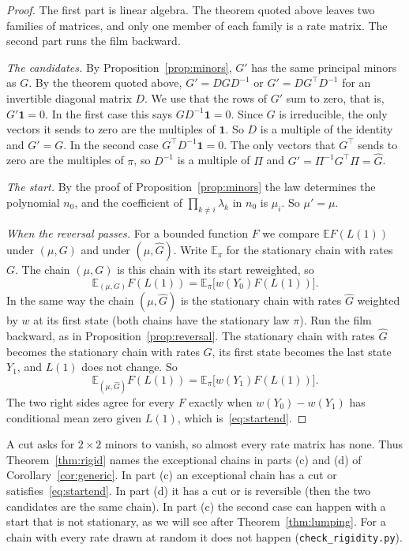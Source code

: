 \documentclass[11pt]{article}
\theoremstyle{definition}
\theoremstyle{remark}
\newcommand{\E}{\mathbb E}
\newcommand{\one}{\mathbf 1}
\begin{document}
\begin{proof}
The first part is linear algebra. The theorem quoted above leaves two
families of matrices, and only one member of each family is a rate matrix. The
second part runs the film backward.

\emph{The candidates.} By Proposition~\ref{prop:minors}, $G'$ has the same
principal minors as $G$. By the theorem quoted above, $G'=DGD^{-1}$ or
$G'=DG^{\top}D^{-1}$ for an invertible diagonal matrix $D$. We use that the rows
of $G'$ sum to zero, that is, $G'\one=0$. In the first case this says
$GD^{-1}\one=0$. Since $G$ is irreducible, the only vectors it sends to zero are
the multiples of $\one$. So $D$ is a multiple of the identity and $G'=G$. In
the second case $G^{\top}D^{-1}\one=0$. The only vectors that $G^{\top}$ sends
to zero are the multiples of $\pi$, so $D^{-1}$ is a multiple of $\Pi$ and
$G'=\Pi^{-1}G^{\top}\Pi=\hat G$.

\emph{The start.} By the proof of Proposition~\ref{prop:minors} the law
determines the polynomial $n_0$, and the coefficient of
$\prod_{k\ne i}\lambda_k$ in $n_0$ is $\mu_i$. So $\mu'=\mu$.

\emph{When the reversal passes.} For a bounded function $F$ we compare
$\E F(L(1))$ under $(\mu,G)$ and under $(\mu,\hat G)$. Write $\E_\pi$ for the
stationary chain with rates $G$. The chain $(\mu,G)$ is this chain with its
start reweighted, so
\[
\E_{(\mu,G)}F(L(1))=\E_\pi\bigl[w(Y_0)F(L(1))\bigr].
\]
In the same way the chain $(\mu,\hat G)$ is the stationary chain with rates
$\hat G$ weighted by $w$ at its first state (both chains have the stationary
law $\pi$). Run the film backward, as in Proposition~\ref{prop:reversal}. The
stationary chain with rates $\hat G$ becomes the stationary chain with rates
$G$, its first state becomes the last state $Y_1$, and $L(1)$ does not change.
So
\[
\E_{(\mu,\hat G)}F(L(1))=\E_\pi\bigl[w(Y_1)F(L(1))\bigr].
\]
The two right sides agree for every $F$ exactly when $w(Y_0)-w(Y_1)$ has
conditional mean zero given $L(1)$, which is~\eqref{eq:startend}.
\end{proof}

A cut asks for $2\times2$ minors to vanish, so almost every rate matrix has
none. Thus Theorem~\ref{thm:rigid} names the exceptional chains in parts (c) and
(d) of Corollary~\ref{cor:generic}. In part (c) an exceptional chain has a cut
or satisfies~\eqref{eq:startend}. In part (d) it has a cut or is reversible
(then the two candidates are the same chain). In part (c) the second case can
happen with a start that is not stationary, as we will see after
Theorem~\ref{thm:lumping}. For a chain with every rate drawn at random it does
not happen (\texttt{check\_rigidity.py}).
\end{document}

